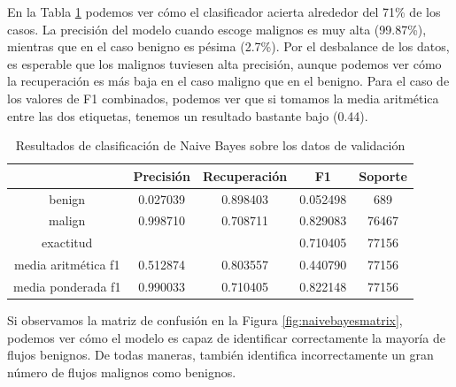 En la Tabla \ref{table:naivebayesresults} podemos ver cómo el clasificador acierta alrededor del 71\% de los casos. La precisión del modelo cuando escoge malignos es muy alta (99.87\%), mientras que en el caso benigno es pésima (2.7\%). Por el desbalance de los datos, es esperable que los malignos tuviesen alta precisión, aunque podemos ver cómo la recuperación es más baja en el caso maligno que en el benigno. Para el caso de los valores de F1 combinados, podemos ver que si tomamos la media aritmética entre las dos etiquetas, tenemos un resultado bastante bajo (0.44).

\begin{table}[H]
    \begin{center}
        \begin{tabular}{|c | c c c | c |} 
            \hline
            & \textbf{Precisión} & \textbf{Recuperación} & \textbf{F1}  & \textbf{Soporte} \\
            \hline
            benign               & 0.027039 & 0.898403 & 0.052498  &   689 \\
            malign               & 0.998710 & 0.708711 & 0.829083  & 76467 \\
            \hline
            exactitud            &          &          & 0.710405  & 77156 \\
            media aritmética f1  & 0.512874 & 0.803557 & 0.440790  & 77156 \\
            media ponderada f1   & 0.990033 & 0.710405 & 0.822148  & 77156 \\
            \hline
        \end{tabular}
    \end{center}
    \caption{Resultados de clasificación de Naive Bayes sobre los datos de validación}
    \label{table:naivebayesresults}
\end{table}

Si observamos la matriz de confusión en la Figura \ref{fig:naivebayesmatrix}, podemos ver cómo el modelo es capaz de identificar correctamente la mayoría de flujos benignos. De todas maneras, también identifica incorrectamente un gran número de flujos malignos como benignos.

